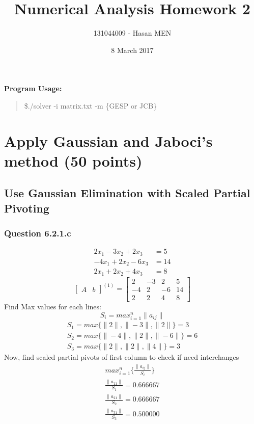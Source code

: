 \documentclass{article}
\title{Numerical Analysis Homework 2}
\author{131044009 - Hasan MEN}
\date{8 March 2017}
\begin{document}
\maketitle
\textbf{Program Usage:} 
\begin{quote}
	\$./solver -i matrix.txt -m \{GESP or JCB\}
\end{quote}
\section{Apply Gaussian and Jaboci's method (50 points)}
\subsection{Use Gaussian Elimination with Scaled Partial Pivoting}
\subsubsection{Question 6.2.1.c}
\begin{align}
\label{q6.2.1.c.1}2x_{1}-3x_{2}+2x_{3}&=5 \\
\label{q6.2.1.c.2}-4x_{1}+2x_{2}-6x_{3}&=14 \\
\label{q6.2.1.c.3}2x_{1}+2x_{2}+4x_{3}&=8
\end{align}
\[
\left[
\begin{array}{c|c}
A&b
\end{array}
\right]^{(1)}
=
\left[
\begin{array}{ccc|c}
	2&-3&2&5\\
	-4&2&-6&14\\
	2&2&4&8 
\end{array}
\right]
\]
Find Max values for each lines: 
\begin{equation}
\label{findSMax1}S_{i}=max_{i=1}^n\|a_{ij}\|
\end{equation}
\begin{align}
	S_{1}=max\{\|2\|,\|-3\|,\|2\|\}=3\\
	S_{2}=max\{\|-4\|,\|2\|,\|-6\|\}=6\\
	S_{3}=max\{\|2\|,\|2\|,\|4\|\}=3
\end{align}
Now, find scaled partial pivots of first column to check if need interchanges
\begin{align}
	max_{i=1}^n\{\frac{\|a_{ij}\|}{S_{i}}\}\\
	\frac{\|a_{11}\|}{S_{1}}=0.666667\\
	\frac{\|a_{21}\|}{S_{2}}=0.666667\\
	\frac{\|a_{31}\|}{S_{3}}=0.500000
\end{align}
\end{document}
